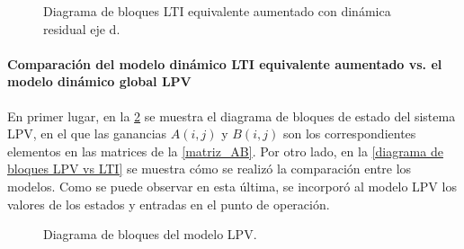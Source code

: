 \documentclass[a4paper, 10pt, onecolumn,journal]{ieeeconf}
\begin{document}
\begin{figure}[H]
	\centering
	\begin{adjustbox}{max width=\columnwidth}
	\end{adjustbox}
	\caption{Diagrama de bloques LTI equivalente aumentado con dinámica residual eje d.}
	\label{diagrama de bloques modelo LTI eq}
\end{figure}

\paragraph{\textbf{Comparación del modelo dinámico LTI equivalente aumentado vs. el modelo dinámico global LPV}}
En primer lugar, en la \cref{diagrama de bloques LPV} se muestra el diagrama de bloques de estado del sistema LPV, en el que las ganancias $A(i, j)$ y $B(i, j)$
son los correspondientes elementos en las matrices de la \cref{matriz_AB}.
Por otro lado, en la \cref{diagrama de bloques LPV vs LTI} se muestra cómo se realizó la comparación entre los modelos. Como se puede observar en esta última,
se incorporó al modelo LPV los valores de los estados y entradas en el punto de operación.
\label{par: LTI vs LPV}
\begin{figure}[H]
	\centering
	\begin{adjustbox}{max width=\columnwidth}
	\end{adjustbox}
	\caption{Diagrama de bloques del modelo LPV.}
	\label{diagrama de bloques LPV}
\end{figure}
\end{document}
